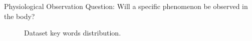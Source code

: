 Physiological Observation Question: Will a specific phenomenon be observed in the body?


\begin{figure*}[!h]
    \centering    
    \renewcommand{\thesubfigure}{} %
    \caption{Dataset key words distribution.}
    \label{fig key words fan}
\end{figure*}







